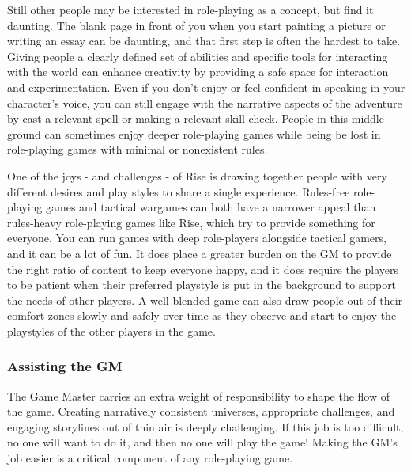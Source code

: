             Still other people may be interested in role-playing as a concept, but find it daunting.
            The blank page in front of you when you start painting a picture or writing an essay can be daunting, and that first step is often the hardest to take.
            Giving people a clearly defined set of abilities and specific tools for interacting with the world can enhance creativity by providing a safe space for interaction and experimentation.
            Even if you don't enjoy or feel confident in speaking in your character's voice, you can still engage with the narrative aspects of the adventure by cast a relevant spell or making a relevant skill check.
            People in this middle ground can sometimes enjoy deeper role-playing games while being be lost in role-playing games with minimal or nonexistent rules.

            One of the joys - and challenges - of Rise is drawing together people with very different desires and play styles to share a single experience.
            Rules-free role-playing games and tactical wargames can both have a narrower appeal than rules-heavy role-playing games like Rise, which try to provide something for everyone.
            You can run games with deep role-players alongside tactical gamers, and it can be a lot of fun.
            It does place a greater burden on the GM to provide the right ratio of content to keep everyone happy, and it does require the players to be patient when their preferred playstyle is put in the background to support the needs of other players.
            A well-blended game can also draw people out of their comfort zones slowly and safely over time as they observe and start to enjoy the playstyles of the other players in the game.

        \subsubsection{Assisting the GM}
            The Game Master carries an extra weight of responsibility to shape the flow of the game.
            Creating narratively consistent universes, appropriate challenges, and engaging storylines out of thin air is deeply challenging.
            If this job is too difficult, no one will want to do it, and then no one will play the game!
            Making the GM's job easier is a critical component of any role-playing game.

